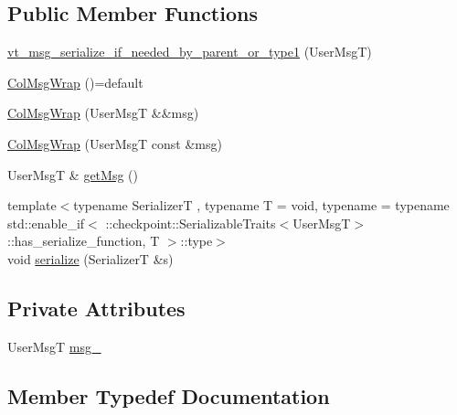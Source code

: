 \subsection*{Public Member Functions}
\begin{DoxyCompactItemize}
\item 
\hyperlink{structvt_1_1vrt_1_1collection_1_1_col_msg_wrap_a016c2ea5370660027aa23dc0dcf44a74}{vt\+\_\+msg\+\_\+serialize\+\_\+if\+\_\+needed\+\_\+by\+\_\+parent\+\_\+or\+\_\+type1} (User\+MsgT)
\item 
\hyperlink{structvt_1_1vrt_1_1collection_1_1_col_msg_wrap_a341d1ea25fb9181d1c06ab66df1478f9}{Col\+Msg\+Wrap} ()=default
\item 
\hyperlink{structvt_1_1vrt_1_1collection_1_1_col_msg_wrap_a9dfc351adf1f31fda9028608d989ce5c}{Col\+Msg\+Wrap} (User\+MsgT \&\&msg)
\item 
\hyperlink{structvt_1_1vrt_1_1collection_1_1_col_msg_wrap_ac19f3573a80a849d41fd5874fe94414a}{Col\+Msg\+Wrap} (User\+MsgT const \&msg)
\item 
User\+MsgT \& \hyperlink{structvt_1_1vrt_1_1collection_1_1_col_msg_wrap_a69d30485a72651a7ede17f6bcdb13cd4}{get\+Msg} ()
\item 
{\footnotesize template$<$typename SerializerT , typename T  = void, typename  = typename std\+::enable\+\_\+if$<$      \+::checkpoint\+::\+Serializable\+Traits$<$\+User\+Msg\+T$>$\+::has\+\_\+serialize\+\_\+function, T    $>$\+::type$>$ }\\void \hyperlink{structvt_1_1vrt_1_1collection_1_1_col_msg_wrap_ad225439a1358090be0ad57cb536eb1d3}{serialize} (SerializerT \&s)
\end{DoxyCompactItemize}
\subsection*{Private Attributes}
\begin{DoxyCompactItemize}
\item 
User\+MsgT \hyperlink{structvt_1_1vrt_1_1collection_1_1_col_msg_wrap_a781048274a322da08bc83a90adc8d37e}{msg\+\_\+}
\end{DoxyCompactItemize}


\subsection{Member Typedef Documentation}
\mbox{\label{structvt_1_1vrt_1_1collection_1_1_col_msg_wrap_a788f0bead8cf9d8b5ed565b54d3c706a}} 
